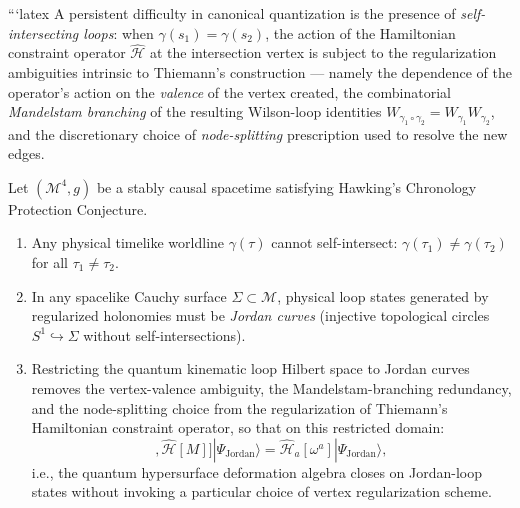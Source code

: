 ```latex
A persistent difficulty in canonical quantization is the presence of \emph{self-intersecting loops}: when $\gamma(s_1) = \gamma(s_2)$, the action of the Hamiltonian constraint operator $\widehat{\mathcal{H}}$ at the intersection vertex is subject to the regularization ambiguities intrinsic to Thiemann's construction --- namely the dependence of the operator's action on the \emph{valence} of the vertex created, the combinatorial \emph{Mandelstam branching} of the resulting Wilson-loop identities $W_{\gamma_1 \circ \gamma_2} = W_{\gamma_1} W_{\gamma_2}$, and the discretionary choice of \emph{node-splitting} prescription used to resolve the new edges.

\begin{theorem}
\label{thm:jordan_chronology}
Let $(\mathcal{M}^4, g)$ be a stably causal spacetime satisfying Hawking's Chronology Protection Conjecture.
\begin{enumerate}[label=(\roman*)]
    \item Any physical timelike worldline $\gamma(\tau)$ cannot self-intersect: $\gamma(\tau_1) \neq \gamma(\tau_2)$ for all $\tau_1 \neq \tau_2$.
    \item In any spacelike Cauchy surface $\Sigma \subset \mathcal{M}$, physical loop states generated by regularized holonomies must be \emph{Jordan curves} (injective topological circles $S^1 \hookrightarrow \Sigma$ without self-intersections).
    \item Restricting the quantum kinematic loop Hilbert space to Jordan curves removes the vertex-valence ambiguity, the Mandelstam-branching redundancy, and the node-splitting choice from the regularization of Thiemann's Hamiltonian constraint operator, so that on this restricted domain:
    \begin{equation}
        [\widehat{\mathcal{H}}[N], \widehat{\mathcal{H}}[M]] |\Psi_{\mathrm{Jordan}}\rangle = \widehat{\mathcal{H}}_a[\omega^a] |\Psi_{\mathrm{Jordan}}\rangle,
    \end{equation}
    i.e., the quantum hypersurface deformation algebra closes on Jordan-loop states without invoking a particular choice of vertex regularization scheme.
\end{enumerate}
\end{theorem}
